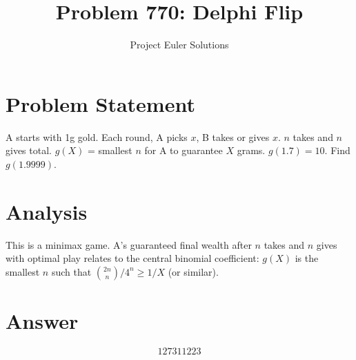 \documentclass[11pt]{article}
\title{Problem 770: Delphi Flip}
\author{Project Euler Solutions}
\date{}
\begin{document}
\maketitle


\section{Problem Statement}
A starts with 1g gold. Each round, A picks $x$, B takes or gives $x$. $n$ takes and $n$ gives total. $g(X)$ = smallest $n$ for A to guarantee $X$ grams. $g(1.7)=10$. Find $g(1.9999)$.

\section{Analysis}
This is a minimax game. A's guaranteed final wealth after $n$ takes and $n$ gives with optimal play relates to the central binomial coefficient: $g(X)$ is the smallest $n$ such that $\binom{2n}{n}/4^n \ge 1/X$ (or similar).

\section{Answer}

\[
\boxed{127311223}
\]
\end{document}
